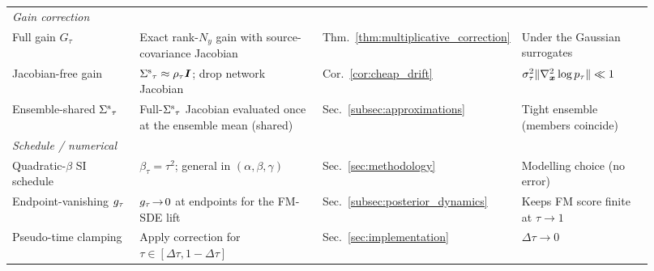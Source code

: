 \begin{table}[ht]
\begin{tabular}{p{0.21\linewidth} p{0.30\linewidth} p{0.20\linewidth} p{0.21\linewidth}}
        \midrule
        \multicolumn{4}{l}{\emph{Gain correction}}\\
        Full gain $G_\tau$ & Exact rank-$N_y$ gain with source-covariance Jacobian & Thm.~\ref{thm:multiplicative_correction} & Under the Gaussian surrogates \\
        Jacobian-free gain & ${\Sigma^{\mathrm{s}}}_\tau\approx\rho_\tau\bm{I}$; drop network Jacobian & Cor.~\ref{cor:cheap_drift} & $\sigma_\tau^2\|\nabla^2_{\boldsymbol{x}}\log p_\tau\|\ll1$ \\
        Ensemble-shared ${\Sigma^{\mathrm{s}}}_\tau$ & Full-${\Sigma^{\mathrm{s}}}_\tau$ Jacobian evaluated once at the ensemble mean (shared) & Sec.~\ref{subsec:approximations} & Tight ensemble (members coincide) \\
        \midrule
        \multicolumn{4}{l}{\emph{Schedule / numerical}}\\
        Quadratic-$\beta$ SI schedule & $\beta_\tau=\tau^2$; general in $(\alpha,\beta,\gamma)$ & Sec.~\ref{sec:methodology} & Modelling choice (no error) \\
        Endpoint-vanishing $g_\tau$ & $g_\tau\!\to\!0$ at endpoints for the FM-SDE lift & Sec.~\ref{subsec:posterior_dynamics} & Keeps FM score finite at $\tau\to1$ \\
        Pseudo-time clamping & Apply correction for $\tau\in[\Delta\tau,1-\Delta\tau]$ & Sec.~\ref{sec:implementation} & $\Delta\tau\to0$ \\
        \bottomrule
    \end{tabular}
\end{table}
